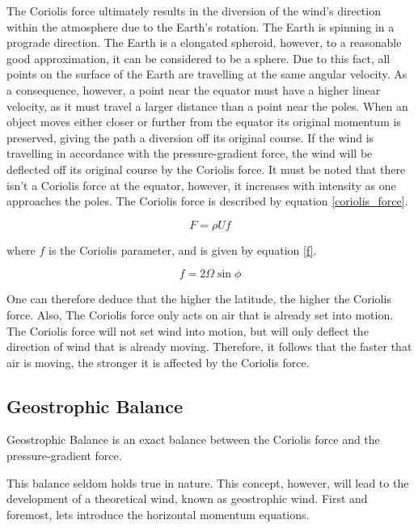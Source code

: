 The Coriolis force ultimately results in the diversion of the wind's direction within the atmosphere due to the Earth's rotation. The Earth is spinning in a prograde direction. The Earth is a elongated spheroid, however, to a reasonable good approximation, it can be considered to be a sphere. Due to this fact, all points on the surface of the Earth are travelling at the same angular velocity. As a consequence, however, a point near the equator must have a higher linear velocity, as it must travel a larger distance than a point near the poles. When an object moves either closer or further from the equator its original momentum is preserved, giving the path a diversion off its original course\cite{corioliseffect_def}. If the wind is travelling in accordance with the pressure-gradient force, the wind will be deflected off its original course by the Coriolis force. It must be noted that there isn't a Coriolis force at the equator, however, it increases with intensity as one approaches the poles. The Coriolis force is described by equation \ref{coriolis_force}.

\begin{equation}
    \label{coriolis_force}
    F = \rho U f
\end{equation}

where $f$ is the Coriolis parameter, and is given by equation \ref{f}.

\begin{equation}
    \label{f}
    f = 2 \Omega \sin{\phi}
\end{equation}

One can therefore deduce that the higher the latitude, the higher the Coriolis force. Also, The Coriolis force only acts on air that is already set into motion. The Coriolis force will not set wind into motion, but will only deflect the direction of wind that is already moving. Therefore, it follows that the faster that air is moving, the stronger it is affected by the Coriolis force\cite{coriolis_effect}.

\subsection{Geostrophic Balance}\label{balance}
\begin{definition}
Geostrophic Balance is an exact balance between the Coriolis force and the pressure-gradient force.
\end{definition}

This balance seldom holds true in nature. This concept, however, will lead to the development of a theoretical wind, known as geostrophic wind. First and foremost, lets introduce the horizontal momentum equations.

